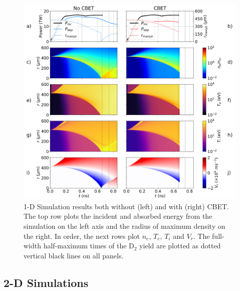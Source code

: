 \begin{figure}[t!]
    \includegraphics[width=\linewidth]{Results2/Images/expl_streaks.png}
    \centering
    \caption{1-D Simulation results both without (left) and with (right) \ac{CBET}.
    The top row plots the incident and absorbed energy from the simulation on the left axis and the radius of maximum density on the right.
    In order, the next rows plot $n_e$, $T_e$, $T_i$ and $V_r$.
    The full-width half-maximum times of the D${}_{2}$ yield are plotted as dotted vertical black lines on all panels.}%
    \label{fig:Res2_expl_streaks}
\end{figure}

\subsection{2-D Simulations}%
\label{sec:Res2_expl2D}


